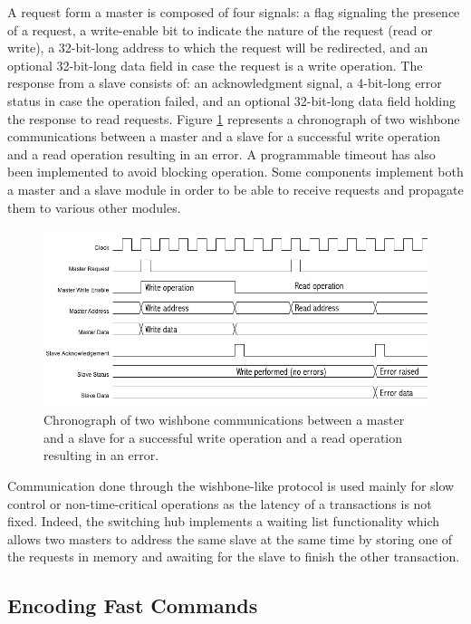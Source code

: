       A request form a master is composed of four signals: a flag signaling the presence of a request, a write-enable bit to indicate the nature of the request (read or write), a 32-bit-long address to which the request will be redirected, and an optional 32-bit-long data field in case the request is a write operation. The response from a slave consists of: an acknowledgment signal, a 4-bit-long error status in case the operation failed, and an optional 32-bit-long data field holding the response to read requests. Figure \ref{fig:II-3-wishbone-chrono} represents a chronograph of two wishbone communications between a master and a slave for a successful write operation and a read operation resulting in an error. A programmable timeout has also been implemented to avoid blocking operation. Some components implement both a master and a slave module in order to be able to receive requests and propagate them to various other modules. \\

      \begin{figure}[h!]
        \centering
        \includegraphics[width=\textwidth]{img/II-3-test-beam/wishbone-chrono.png}
        \caption{Chronograph of two wishbone communications between a master and a slave for a successful write operation and a read operation resulting in an error.}
        \label{fig:II-3-wishbone-chrono}
      \end{figure}

      Communication done through the wishbone-like protocol is used mainly for slow control or non-time-critical operations as the latency of a transactions is not fixed. Indeed, the switching hub implements a waiting list functionality which allows two masters to address the same slave at the same time by storing one of the requests in memory and awaiting for the slave to finish the other transaction.

    \subsection{Encoding Fast Commands}

